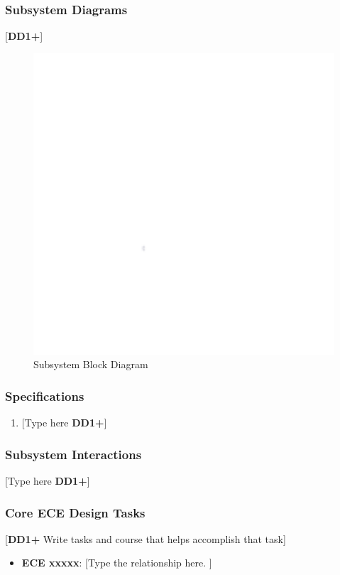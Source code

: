 \documentclass[letterpaper, 11pt]{article}
\begin{document}
\subsubsection{Subsystem Diagrams}
[\textbf{DD1+}]
\begin{figure}[h]
    \centering
    \includegraphics[width=16cm]{images/white.png} %
    \caption{Subsystem Block Diagram}
\end{figure} %

\subsubsection{Specifications}
\begin{enumerate}
    \item {[Type here \textbf{DD1+}]}
\end{enumerate}

\subsubsection{Subsystem Interactions}
[Type here \textbf{DD1+}]

\subsubsection{Core ECE Design Tasks}
[\textbf{DD1+} Write tasks and course that helps accomplish that task]
\begin{itemize}
    \item \textbf{ECE xxxxx}: [Type the relationship here. ]
\end{itemize}
\end{document}

